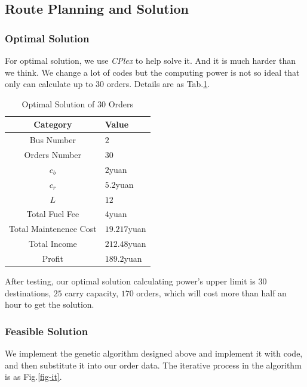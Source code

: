 \documentclass{llncs}
\begin{document}
\subsection{Route Planning and Solution}
\subsubsection{Optimal Solution}
For optimal solution, we use \emph{CPlex} to help solve it. And it is much harder than we think. We change a lot of codes but the computing power is not so ideal that only can calculate up to $30$ orders. Details are as Tab.\ref{tab-optimal}.

	 	\begin{table}[htbp]
			\caption{Optimal Solution of $30$ Orders}
			\begin{center}
			\begin{tabular}{|c|l|}
			\hline
			Category & Value \\
			\hline
			Bus Number	   & $2$ \\
			\hline
			Orders Number	& $30$ \\
			\hline
			$c_b$			& $2$yuan \\
			\hline
			$c_r$			& $5.2$yuan \\
			\hline
			$L$			    & $12$ \\
			\hline
			Total Fuel Fee			& $4$yuan \\
			\hline
			Total Maintenence Cost		& $19.217$yuan \\
			\hline
			Total Income			& $212.48$yuan \\
			\hline
			Profit			& $189.2$yuan \\
			\hline
			\end{tabular}
			\end{center}
	\label{tab-optimal}
		\end{table}

After testing, our optimal solution calculating power's upper limit is $30$ destinations, $25$ carry capacity, $170$ orders, which will cost more than half an hour to get the solution.
\subsubsection{Feasible Solution}
We implement the genetic algorithm designed above and implement it with code, and then substitute it into our order data. The iterative process in the algorithm is as Fig.\ref{fig-it}.
\end{document}
